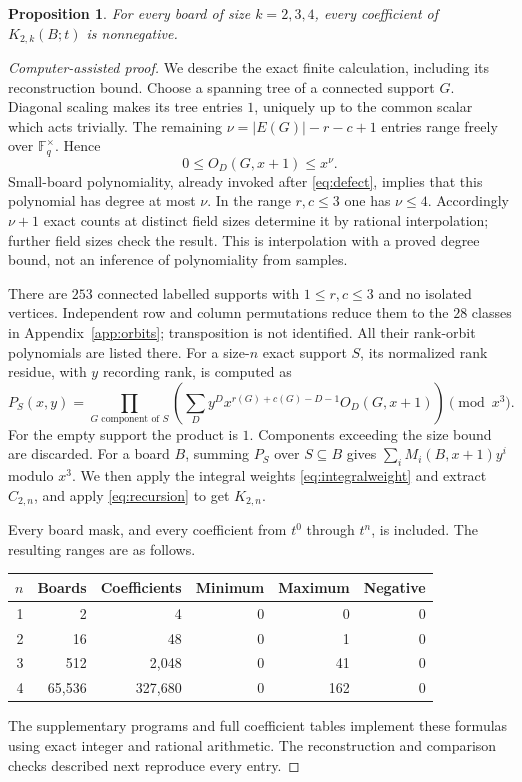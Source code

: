 \documentclass[11pt]{article}
\newtheorem{proposition}[theorem]{Proposition}
\newcommand{\FF}{\mathbb F}
\begin{document}
\begin{proposition}\label{prop:finite}
For every board of size $k=2,3,4$, every coefficient of
$K_{2,k}(B;t)$ is nonnegative.
\end{proposition}
\begin{proof}[Computer-assisted proof]
We describe the exact finite calculation, including its reconstruction
bound. Choose a spanning tree of a connected support $G$. Diagonal
scaling makes its tree entries $1$, uniquely up to the common scalar
which acts trivially. The remaining
$\nu=|E(G)|-r-c+1$ entries range freely over $\FF_q^\times$. Hence
\[
 0\leq O_D(G,x+1)\leq x^\nu.
\]
Small-board polynomiality, already invoked after \eqref{eq:defect},
implies that this polynomial has degree at most $\nu$. In the range
$r,c\leq3$ one has $\nu\leq4$. Accordingly $\nu+1$ exact counts at
distinct field sizes determine it by rational interpolation; further
field sizes check the result. This is interpolation with a proved
degree bound, not an inference of polynomiality from samples.

There are $253$ connected labelled supports with $1\leq r,c\leq3$
and no isolated vertices. Independent row and column permutations
reduce them to the $28$ classes in Appendix~\ref{app:orbits};
transposition is not identified. All their rank-orbit polynomials are
listed there. For a size-$n$ exact support $S$, its normalized rank
residue, with $y$ recording rank, is computed as
\begin{equation}\label{eq:supportproduct}
 P_S(x,y)=\prod_{G\text{ component of }S}
       \left(\sum_D y^D x^{r(G)+c(G)-D-1}O_D(G,x+1)\right)
                  \pmod{x^3}.
\end{equation}
For the empty support the product is $1$. Components exceeding the
size bound are discarded. For a board $B$, summing $P_S$ over
$S\subseteq B$ gives $\sum_i M_i(B,x+1)y^i$ modulo $x^3$.
We then apply the integral weights \eqref{eq:integralweight} and
extract $C_{2,n}$, and apply \eqref{eq:recursion} to get $K_{2,n}$.

Every board mask, and every coefficient from $t^0$ through $t^n$, is
included. The resulting ranges are as follows.
\begin{center}
\begin{tabular}{rrrrrr}
\toprule
$n$ & Boards & Coefficients & Minimum & Maximum & Negative\\
\midrule
1 & 2 & 4 & 0 & 0 & 0\\
2 & 16 & 48 & 0 & 1 & 0\\
3 & 512 & 2,048 & 0 & 41 & 0\\
4 & 65,536 & 327,680 & 0 & 162 & 0\\
\bottomrule
\end{tabular}
\end{center}
The supplementary programs and full coefficient tables implement these
formulas using exact integer and rational arithmetic. The reconstruction
and comparison checks described next reproduce every entry.
\end{proof}
\end{document}
